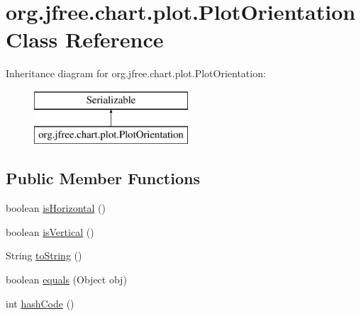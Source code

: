 \hypertarget{classorg_1_1jfree_1_1chart_1_1plot_1_1_plot_orientation}{}\section{org.\+jfree.\+chart.\+plot.\+Plot\+Orientation Class Reference}
\label{classorg_1_1jfree_1_1chart_1_1plot_1_1_plot_orientation}
Inheritance diagram for org.\+jfree.\+chart.\+plot.\+Plot\+Orientation\+:\begin{figure}[H]
\begin{center}
\leavevmode
\includegraphics[height=2.000000cm]{classorg_1_1jfree_1_1chart_1_1plot_1_1_plot_orientation}
\end{center}
\end{figure}
\subsection*{Public Member Functions}
\begin{DoxyCompactItemize}
\item 
boolean \mbox{\hyperlink{classorg_1_1jfree_1_1chart_1_1plot_1_1_plot_orientation_a98ce1883cca5bbeda29325d4c667ac7e}{is\+Horizontal}} ()
\item 
boolean \mbox{\hyperlink{classorg_1_1jfree_1_1chart_1_1plot_1_1_plot_orientation_a60f166f26b81bbbead6b029b7627a8df}{is\+Vertical}} ()
\item 
String \mbox{\hyperlink{classorg_1_1jfree_1_1chart_1_1plot_1_1_plot_orientation_a3fb515dcbb319b1a2c6866bbb9515e01}{to\+String}} ()
\item 
boolean \mbox{\hyperlink{classorg_1_1jfree_1_1chart_1_1plot_1_1_plot_orientation_accc26c2333ee0c23eb94e5fde0a95f72}{equals}} (Object obj)
\item 
int \mbox{\hyperlink{classorg_1_1jfree_1_1chart_1_1plot_1_1_plot_orientation_a36c6fb99fff2d6ad0809c60a746256bb}{hash\+Code}} ()
\end{DoxyCompactItemize}
